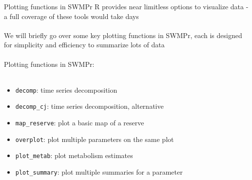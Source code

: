 \documentclass[xcolor=dvipsnames]{beamer}\usepackage[]{graphicx}\usepackage[]{color}
\begin{document}
\begin{frame}[fragile]{Plotting functions in SWMPr}
R provides near limitless options to visualize data - a full coverage of these tools would take days \\~\\
We will briefly go over some key plotting functions in SWMPr, each is designed for simplicity and efficiency to summarize lots of data \\~\\
Plotting functions in SWMPr: \\~\\
\begin{itemize}
\item \texttt{decomp}: time series decomposition
\item \texttt{decomp\_cj}: time series decomposition, alternative
\item \texttt{map\_reserve}: plot a basic map of a reserve
\item \texttt{overplot}: plot multiple parameters on the same plot
\item \texttt{plot\_metab}: plot metabolism estimates
\item \texttt{plot\_summary}: plot multiple summaries for a parameter
\end{itemize}
\end{frame}
\end{document}
